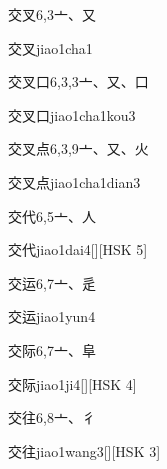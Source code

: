 \begin{entry}{交叉}{6,3}{⼇、⼜}
  \begin{phonetics}{交叉}{jiao1cha1}
  \end{phonetics}
\end{entry}

\begin{entry}{交叉口}{6,3,3}{⼇、⼜、⼝}
  \begin{phonetics}{交叉口}{jiao1cha1kou3}
  \end{phonetics}
\end{entry}

\begin{entry}{交叉点}{6,3,9}{⼇、⼜、⽕}
  \begin{phonetics}{交叉点}{jiao1cha1dian3}
  \end{phonetics}
\end{entry}

\begin{entry}{交代}{6,5}{⼇、⼈}
  \begin{phonetics}{交代}{jiao1dai4}[][HSK 5]
  \end{phonetics}
\end{entry}

\begin{entry}{交运}{6,7}{⼇、⾡}
  \begin{phonetics}{交运}{jiao1yun4}
  \end{phonetics}
\end{entry}

\begin{entry}{交际}{6,7}{⼇、⾩}
  \begin{phonetics}{交际}{jiao1ji4}[][HSK 4]
  \end{phonetics}
\end{entry}

\begin{entry}{交往}{6,8}{⼇、⼻}
  \begin{phonetics}{交往}{jiao1wang3}[][HSK 3]
  \end{phonetics}
\end{entry}

